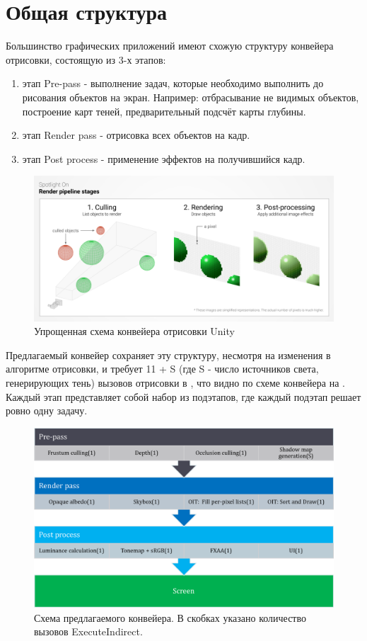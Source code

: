 \section{Общая структура} \label{ch3:pipeline_struct}
	Большинство графических приложений имеют схожую структуру конвейера отрисовки, состоящую из 3-х этапов:
	\begin{enumerate}[1.] 
		\item этап Pre-pass - выполнение задач, которые необходимо выполнить до рисования объектов на экран. Например: отбрасывание не видимых объектов, построение карт теней, предварительный подсчёт карты глубины.
		\item этап Render pass - отрисовка всех объектов на кадр.
		\item этап Post process - применение эффектов на получившийся кадр.
	\end{enumerate}
		
	\begin{figure}[ht!] 
		\center
		\includegraphics [scale=0.35] {my_folder/images//unity_pipeline}	
		\caption{Упрощенная схема конвейера отрисовки Unity} 
		\label{fig:unity_pipeline}  
	\end{figure}

	Предлагаемый конвейер сохраняет эту структуру, несмотря на изменения в алгоритме отрисовки, и требует 11 + S (где S - число источников света, генерирующих тень) вызовов отрисовки в , что видно по схеме конвейера на . Каждый этап представляет собой набор из подэтапов, где каждый подэтап решает ровно одну задачу.
	
	\begin{figure}[ht!] 
		\center
		\includegraphics [scale=0.4] {my_folder/images//pipeline_schema}	
		\caption{Схема предлагаемого конвейера. В скобках указано количество вызовов ExecuteIndirect.} 
		\label{fig:pipeline_schema}  
	\end{figure}
	
	\FloatBarrier